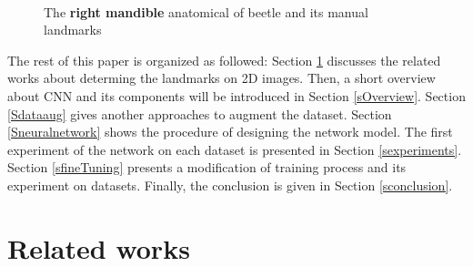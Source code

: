 \documentclass[review]{elsarticle}
\begin{document}
\begin{figure}[htbp]
    \centering
{}~~
    \caption{The \textbf{right mandible} anatomical of beetle and its manual landmarks}
    \label{figbeetle5}
\end{figure}

The rest of this paper is organized as followed: Section \ref{related_works} discusses the related works about determing the landmarks on 2D images. Then, a short overview about CNN and its components will be introduced in Section \ref{sOverview}. Section \ref{Sdataaug} gives another approaches to augment the dataset. Section \ref{Sneuralnetwork} shows the procedure of designing the network model. The first experiment of the network on each dataset is presented in Section \ref{sexperiments}. Section \ref{sfineTuning} presents a modification of training process and its experiment on datasets. Finally, the conclusion is given in Section \ref{sconclusion}.

\section{Related works}
\label{related_works}
\end{document}
